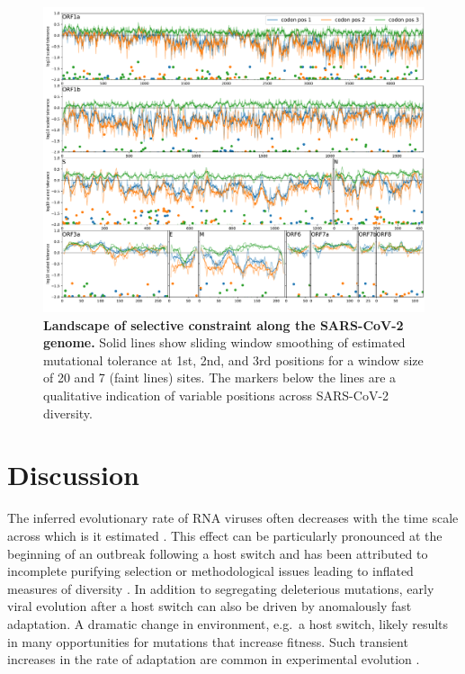 \documentclass[aps,rmp, twocolumn]{revtex4}
\begin{document}
 \begin{figure}[tb]
    \includegraphics[width=\textwidth]{figures/fitness_landscape.pdf}
    \caption{{\bf Landscape of selective constraint along the SARS-CoV-2 genome.}
    Solid lines show sliding window smoothing of estimated mutational tolerance at 1st, 2nd, and 3rd positions for a window size of 20 and 7 (faint lines) sites.
    The markers below the lines are a qualitative indication of variable positions across SARS-CoV-2 diversity.
    \label{fig:fitness_landscape}}
 \end{figure}

\section*{Discussion}
The inferred evolutionary rate of RNA viruses often decreases with the time scale across which is it estimated \citep{wertheim_purifying_2011,ghafari_prisoner_2021}.
This effect can be particularly pronounced at the beginning of an outbreak following a host switch and has been attributed to incomplete purifying selection or methodological issues leading to inflated measures of diversity \citep{meyer_time_2015,ghafari_purifying_2022}.
In addition to segregating deleterious mutations, early viral evolution after a host switch can also be driven by anomalously fast adaptation.
A dramatic change in environment, e.g.~a host switch, likely results in many opportunities for mutations that increase fitness.
Such transient increases in the rate of adaptation are common in experimental evolution \citep{elena_virus_2007}.
\end{document}
